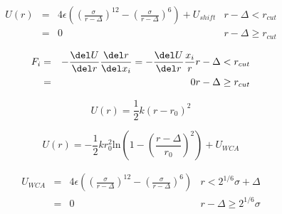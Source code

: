 \documentclass{article}
\begin{document}
\begin{eqnarray*} U(r) &=& 4\epsilon\left(\left(\frac{\sigma}{r-\Delta}\right)^{12} - \left(\frac{\sigma}{r-\Delta}\right)^{6}\right) + U_{shift} & r - \Delta < r_{cut} \\ &=& 0 & r - \Delta \ge r_{cut} \end{eqnarray*}
\pagebreak

\begin{eqnarray*} F_i &=& -\frac{\del U}{\del r}\frac{\del r}{\del x_i} = -\frac{\del U}{\del r}\frac{x_i}{r} & r - \Delta < r_{cut} \\ &=& 0 & r - \Delta \ge r_{cut} \end{eqnarray*}
\pagebreak

\[ U(r) = \frac{1}{2}k\left(r - r_{0}\right)^2 \]
\pagebreak

\[ U(r) = -\frac{1}{2}kr_{0}^2\text{ln}\left(1-\left(\frac{r-\Delta}{r_0}\right)^2\right) + U_{WCA} \]
\pagebreak

\begin{eqnarray*} U_{WCA} &=& 4\epsilon \left( \left( \frac{\sigma}{r-\Delta} \right)^{12} - \left( \frac{\sigma}{r-\Delta} \right)^6 \right) & r < 2^{1/6}\sigma+\Delta \\ &=& 0 &r-\Delta \ge 2^{1/6}\sigma \end{eqnarray*}
\pagebreak
\end{document}
